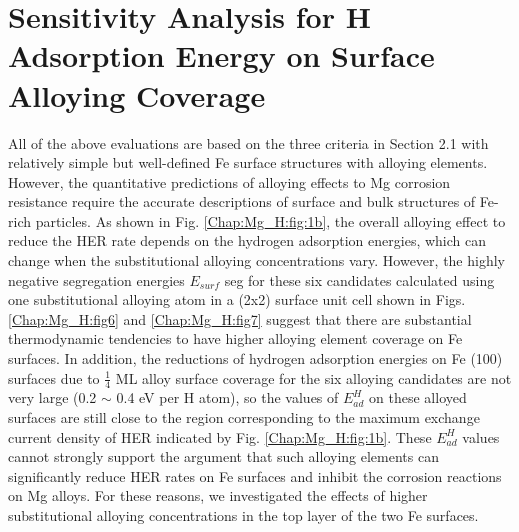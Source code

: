 \section{Sensitivity Analysis for H Adsorption Energy on Surface Alloying Coverage}

All of the above evaluations are based on the three criteria in Section 2.1 with relatively simple but well-defined Fe surface structures with alloying elements. However, the quantitative predictions of alloying effects to Mg corrosion resistance require the accurate descriptions of surface and bulk structures of Fe-rich particles. As shown in Fig. \ref{Chap:Mg_H:fig:1b}, the overall alloying effect to reduce the \ac{HER} rate depends on the hydrogen adsorption energies, which can change when the substitutional alloying concentrations vary. However, the highly negative segregation energies $E_{surf}$ seg for these six candidates calculated using one substitutional alloying atom in a (2x2) surface unit cell shown in Figs. \ref{Chap:Mg_H:fig6} and \ref{Chap:Mg_H:fig7} suggest that there are substantial thermodynamic tendencies to have higher alloying element coverage on Fe surfaces. In addition, the reductions of hydrogen adsorption energies on Fe (100) surfaces due to $\frac{1}{4}$ \ac{ML} alloy surface coverage for the six alloying candidates are not very large (0.2 $\sim$ 0.4 eV per H atom), so the values of $E_{ad}^H$  on these alloyed surfaces are still close to the region corresponding to the maximum exchange current density of HER indicated by Fig. \ref{Chap:Mg_H:fig:1b}. These $E_{ad}^H$ values cannot strongly support the argument that such alloying elements can significantly reduce HER rates on Fe surfaces and inhibit the corrosion reactions on Mg alloys. For these reasons, we investigated the effects of higher substitutional alloying concentrations in the top layer of the two Fe surfaces. 


